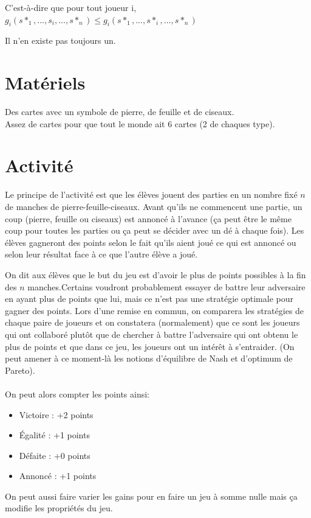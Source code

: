 \documentclass{article}
\begin{document}
C'est-à-dire que pour tout joueur i, $g_i(s*_1, ..., s_i, ..., s*_n) \leq g_i(s*_1, ..., s*_i, ..., s*_n)$

Il n'en existe pas toujours un.

\section{Matériels}
Des cartes avec un symbole de pierre, de feuille et de ciseaux. \\
Assez de cartes pour que tout le monde ait 6 cartes (2 de chaques type).
\newpage
\section{Activité}

Le principe de l'activité est que les élèves jouent des parties en un nombre fixé $n$ de manches de pierre-feuille-ciseaux. Avant qu'ils ne commencent une partie, un coup (pierre, feuille ou ciseaux) est annoncé à l'avance (ça peut être le même coup pour toutes les parties ou ça peut se décider avec un dé à chaque fois). Les élèves gagneront des points selon le fait qu'ils aient joué ce qui est annoncé ou selon leur résultat face à ce que l'autre élève a joué.

On dit aux élèves que le but du jeu est d'avoir le plus de points possibles à la fin des $n$ manches.Certains voudront probablement essayer de battre leur adversaire en ayant plus de points que lui, mais ce n'est pas une stratégie optimale pour gagner des points. Lors d'une remise en commun, on comparera les stratégies de chaque paire de joueurs et on constatera (normalement) que ce sont les joueurs qui ont collaboré plutôt que de chercher à battre l'adversaire qui ont obtenu le plus de points et que dans ce jeu, les joueurs ont un intérêt à s'entraider. (On peut amener à ce moment-là les notions d'équilibre de Nash et d'optimum de Pareto).
\\
\\
On peut alors compter les points ainsi:
\begin{itemize}
    \item Victoire : +2 points
    \item Égalité : +1 points
    \item Défaite : +0 points
    \item Annoncé : +1 points
\end{itemize}
On peut aussi faire varier les gains pour en faire un jeu à somme nulle mais ça modifie les propriétés du jeu. 
\end{document}
